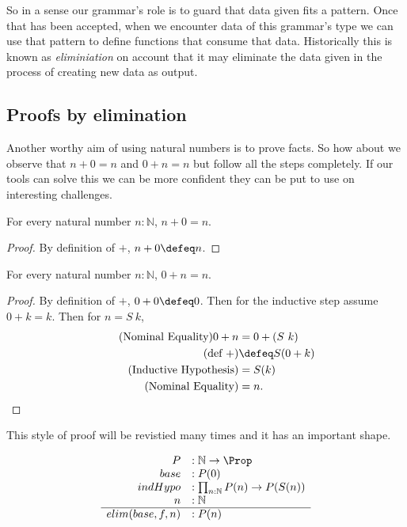 So in a sense our grammar's role is to guard that data given fits 
a pattern.  Once that has been accepted, when we encounter data 
of this grammar's type we can use that pattern to define functions 
that consume that data.  Historically this is known as \emph{eliminiation}
on account that it may eliminate the data given in the process of 
creating new data as output.  

\subsection{Proofs by elimination}
Another worthy aim of using natural numbers is to prove facts.
So how about we observe that $n+0=n$ and $0+n=n$ but follow all the steps 
completely.  If our tools can solve this we can be more confident they 
can be put to use on interesting challenges.

\begin{proposition}
    For every natural number $n:\mathbb{N}$, $n+0=n$.
\end{proposition}
\begin{proof}
    By definition of $+$, $n+0\defeq n$.
\end{proof}


\begin{proposition}
    For every natural number $n:\mathbb{N}$, $0+n=n$.
\end{proposition}
\begin{proof}
    By definition of $+$, $0+0\defeq 0$.
    Then for the inductive step assume 
    $0+k=k$.  Then for $n=S~k$, 
    \begin{align*}
        \tag{Nominal Equality}
        0+n & = 0+(S~k)\\
        \tag{def $+$}
        & \defeq S(0+k)\\
        \tag{Inductive Hypothesis}
        & =S(k)\\
        \tag{Nominal Equality}
        & =n.
\end{align*}
\end{proof}

This style of proof will be revistied many times and 
it has an important shape.

\begin{gather}
    \begin{array}{rl}
        P&:\mathbb{N}\to \Prop\\
        base &: P(0)\\
        indHypo &: \prod_{n:\mathbb{N}}P(n)\to P(S(n))\\
        n & :\mathbb{N}\\
        \hline 
        elim(base,f,n)&:P(n)
    \end{array}
\end{gather}
